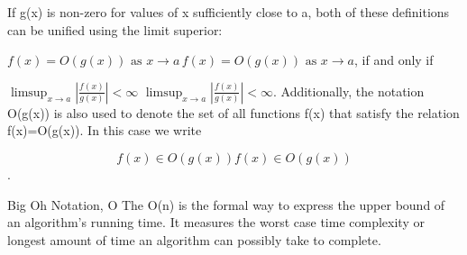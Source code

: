 \documentclass{beamer}
\begin{document}
\begin{frame}
If g(x) is non-zero for values of x sufficiently close to a, both of these definitions can be unified using the limit superior:

${\displaystyle f(x)=O(g(x)){\text{ as }}x\to a\,} f(x)=O(g(x)){\text{ as }}x\to a $,
if and only if

${\displaystyle \limsup _{x\to a}\left|{\frac {f(x)}{g(x)}}\right|<\infty }$ ${\displaystyle \limsup _{x\to a}\left|{\frac {f(x)}{g(x)}}\right|<\infty }$.
Additionally, the notation O(g(x)) is also used to denote the set of all functions f(x) that satisfy the relation f(x)=O(g(x)). In this case we write

\[{\displaystyle f(x)\in O(g(x))} f(x)\in O(g(x))\].
\end{frame}
\begin{frame}
Big Oh Notation, Ο
The Ο(n) is the formal way to express the upper bound of an algorithm's running time. It measures the worst case time complexity or longest amount of time an algorithm can possibly take to complete.

\end{frame}
\end{document}
